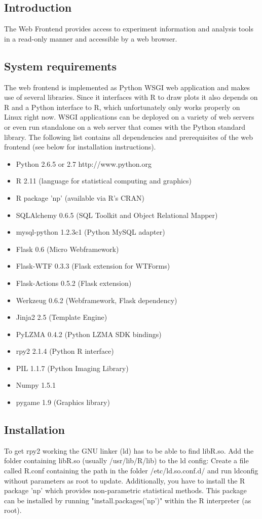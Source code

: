 \upshape
{}
\subsection{Introduction}
The Web Frontend provides access to experiment information and analysis tools in a read-only manner
and accessible by a web browser.

\subsection{System requirements}
The web frontend is implemented as Python WSGI web application and makes use of several libraries.
Since it interfaces with R to draw plots it also depends on R and a Python interface to R, which unfortunately
only works properly on Linux right now.
WSGI applications can be deployed on a variety of web servers or even run standalone on a web server that comes with the
Python standard library.
The following list contains all dependencies and prerequisites of the web frontend (see below for installation instructions).
\begin{itemize}
\item Python 2.6.5 or 2.7 http://www.python.org
\item R 2.11 (language for statistical computing and graphics)
\item R package 'np' (available via R's CRAN)
\item SQLAlchemy 0.6.5 (SQL Toolkit and Object Relational Mapper)
\item mysql-python 1.2.3c1 (Python MySQL adapter)
\item Flask 0.6 (Micro Webframework)
\item Flask-WTF 0.3.3 (Flask extension for WTForms)
\item Flask-Actions 0.5.2 (Flask extension)
\item Werkzeug 0.6.2 (Webframework, Flask dependency)
\item Jinja2 2.5 (Template Engine)
\item PyLZMA 0.4.2 (Python LZMA SDK bindings)
\item rpy2 2.1.4 (Python R interface)
\item PIL 1.1.7 (Python Imaging Library)
\item Numpy 1.5.1
\item pygame 1.9 (Graphics library)
\end{itemize}

\subsection{Installation}
To get rpy2 working the GNU linker (ld) has to be able to find libR.so. Add the folder containing
libR.so (usually /usr/lib/R/lib) to the ld config: Create a file called R.conf containing the
path in the folder /etc/ld.so.conf.d/ and run ldconfig without parameters as root to update.
Additionally, you have to install the R package 'np' which provides non-parametric statistical
methods. This package can be installed by running "install.packages('np')" within the R interpreter (as root).

